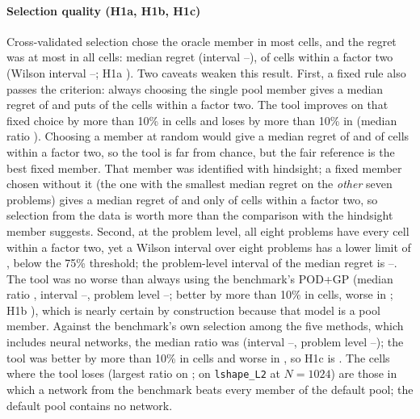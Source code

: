 \paragraph{Selection quality (H1a, H1b, H1c)} Cross-validated selection chose the oracle member in most cells, and the regret was at most \SoneMax{} in all \SoneN{} cells: median regret \SoneMedian{} (interval \SoneLo--\SoneHi), \SoneShare{} of cells within a factor two (Wilson interval \SoneWlo--\SoneWhi; H1a \SoneVerdict). Two caveats weaken this result. First, a fixed rule also passes the criterion: always choosing the single pool member \FixedBestName{} gives a median regret of \FixedBestRegret{} and puts \FixedBestShare{} of the cells within a factor two. The tool improves on that fixed choice by more than 10\% in \FixedBestBetter{} cells and loses by more than 10\% in \FixedBestWorse{} (median ratio \FixedBestRatio). Choosing a member at random would give a median regret of \NullRegret{} and \NullShare{} of cells within a factor two, so the tool is far from chance, but the fair reference is the best fixed member. That member was identified with hindsight; a fixed member chosen without it (the one with the smallest median regret on the \emph{other} seven problems) gives a median regret of \LopoRegret{} and only \LopoShare{} of cells within a factor two, so selection from the data is worth more than the comparison with the hindsight member suggests. Second, at the problem level, all eight problems have every cell within a factor two, yet a Wilson interval over eight problems has a lower limit of \PlSoneWlo, below the 75\% threshold; the problem-level interval of the median regret is \PlSoneLo--\PlSoneHi.
The tool was no worse than always using the benchmark's POD+GP (median ratio \StwoMedian, interval \StwoLo--\StwoHi, problem level \PlStwoLo--\PlStwoHi; better by more than 10\% in \StwoBetter{} cells, worse in \StwoWorse; H1b \StwoVerdict), which is nearly certain by construction because that model is a pool member. Against the benchmark's own selection among the five methods, which includes neural networks, the median ratio was \SthreeMedian{} (interval \SthreeLo--\SthreeHi, problem level \PlSthreeLo--\PlSthreeHi); the tool was better by more than 10\% in \SthreeBetter{} cells and worse in \SthreeWorse, so H1c is \textbf{\SthreeVerdict}. The cells where the tool loses (largest ratio \SthreeMaxRatio{} on \SthreeMaxWhere{}; \SthreeLshapeRatio{} on \texttt{lshape\_L2} at $N=1024$) are those in which a network from the benchmark beats every member of the default pool; the default pool contains no network.
\begin{table}[t]\centering\caption{Test error (geometric mean over three seeds) on the eight problems solved by third-party code: SurroSelect, the oracle (best pool member by test error), always POD+GP, the benchmark's validation-selected method, and the tuned network (only $N=256$ and $1024$).}\label{tab:tperrors}\scriptsize\resizebox{\textwidth}{!}{}\end{table}
